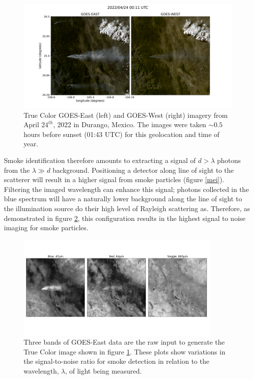 \documentclass{article}
\begin{document}
\begin{figure}\label{16_vs_17}
    \centering
    \includegraphics[width=12cm]{figures/G16_v_G17.png}
    \caption{True Color GOES-East (left) and GOES-West (right) imagery from April \(24^{th}\), 2022 in Durango, Mexico. The images were taken \(\sim0.5\) hours before sunset (01:43 UTC) for this geolocation and time of year.}\label{16vs17}
\end{figure}

Smoke identification therefore amounts to extracting a signal of \(d > \lambda\) photons from the \(\lambda \gg d\) background. Positioning a detector along line of sight to the scatterer will result in a higher signal from smoke particles (figure \ref{mei}). Filtering the imaged wavelength can enhance this signal; photons collected in the blue spectrum will have a naturally lower background along the line of sight to the illumination source do their high level of Rayleigh scattering as. Therefore, as demonstrated in figure \ref{bands}, this configuration results in the highest signal to noise imaging for smoke particles.   

\begin{figure}
    \centering
    \includegraphics[width=10cm]{figures/GOES16_bands.png}
    \caption{Three bands of GOES-East data are the raw input to generate the True Color image shown in figure \ref{16vs17}. These plots show variations in the signal-to-noise ratio for smoke detection in relation to the wavelength, \(\lambda\), of light being measured.}\label{bands}
\end{figure}
\end{document}
